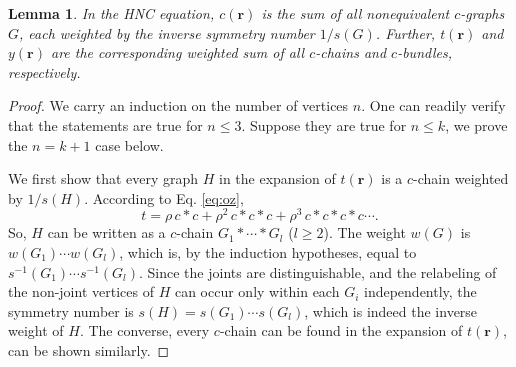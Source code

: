 \documentclass[preprint]{revtex4-1}
\newtheorem{lemm}[thrm]{Lemma}
\newcommand{\vct}[1]{\mathbf{#1}}
\providecommand{\vr}{} %
\renewcommand{\vr}{\vct{r}}
\begin{document}
\begin{lemm}
In the HNC equation,
%
$c(\vr)$
  is the sum of all nonequivalent $c$-graphs $G$,
  each weighted by the inverse symmetry number $1/s(G)$.
Further, $t(\vr)$ and $y(\vr)$ are the corresponding weighted sum of all
  $c$-chains and $c$-bundles, respectively.
  \label{thm:hnccr}
\end{lemm}
%
%
%
\begin{proof}
%
We carry an induction on the number of vertices $n$.
%
One can readily verify that the statements are true for $n \le 3$.
%
Suppose they are true for $n \le k$,
  we prove the $n = k + 1$ case below.


We first show that
  every graph $H$ in the expansion of $t(\vr)$
  is a $c$-chain weighted by $1/s(H)$.
%
According to Eq. \eqref{eq:oz},
\[
  t = \rho \, c*c + \rho^2 \, c * c * c + \rho^3 \, c*c*c*c \cdots.
\]
So, $H$ can be written as a $c$-chain
  $G_1 * \cdots * G_l$ ($l \ge 2$).
%
The weight $w(G)$ is
  $w(G_1) \cdots w(G_l)$,
  which is, by the induction hypotheses, equal to
  $s^{-1}(G_1) \cdots s^{-1}(G_l)$.
%
Since the joints are distinguishable,
  and the relabeling of the non-joint vertices  of $H$
  can occur only within each $G_i$ independently,
  the symmetry number is
  $s(H) = s(G_1) \cdots s(G_l)$,
  which is indeed the inverse weight of $H$.
%
The converse, every $c$-chain can be found in the expansion of $t(\vr)$,
can be shown similarly.


\end{proof}
\end{document}
